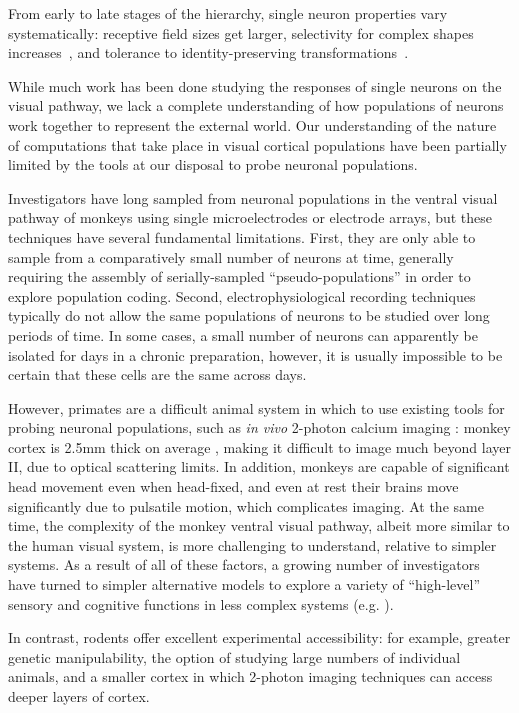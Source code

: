 From early to late stages of the hierarchy, single neuron properties vary systematically:  receptive field sizes get larger, selectivity for complex shapes increases~\cite{Desimone1984, Logothetis1996}, and tolerance to identity-preserving transformations~\cite{REFREF}. 

 While much work has been done studying the responses of single neurons on the visual pathway, we lack a complete understanding of how populations of neurons work together to represent the external world. Our understanding of the nature of computations that take place in visual cortical populations have been partially limited by the tools at our disposal to probe neuronal populations.   
 
 Investigators have long sampled from neuronal populations in the ventral visual pathway of monkeys using single microelectrodes or electrode arrays, but these techniques have several fundamental limitations. First, they are only able to sample from a comparatively small number of neurons at time, generally requiring the assembly of serially-sampled ``pseudo-populations'' in order to explore population coding. Second, electrophysiological recording techniques typically do not allow the same populations of neurons to be studied over long periods of time. In some cases, a small number of neurons can apparently be isolated for days in a chronic preparation, however, it is usually impossible to be certain that these cells are the same across days.

However, primates are a difficult animal system in which to use existing tools for probing neuronal populations, such as \textit{in vivo} 2-photon calcium imaging \cite{Ohki2005}: monkey cortex is 2.5mm thick on average \cite{Koo:2012aa}, making it difficult to image much beyond layer II, due to optical scattering limits. In addition, monkeys are capable of significant head movement even when head-fixed, and even at rest their brains move significantly due to pulsatile motion, which complicates imaging. At the same time, the complexity of the monkey ventral visual pathway, albeit more similar to the human visual system, is more challenging to understand, relative to simpler systems. As a result of all of these factors, a growing number of investigators have turned to simpler alternative models to explore a variety of ``high-level'' sensory and cognitive functions in less complex systems (e.g. \cite{kepecs2008neural, zeeb2009serotonergic}).

In contrast, rodents offer excellent experimental accessibility: for example, greater genetic manipulability, the option of studying large numbers of individual animals, and a smaller cortex in which 2-photon imaging techniques can access deeper layers of cortex. 

